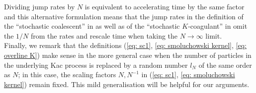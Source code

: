 \documentclass[11pt, notitlepage]{article}
\begin{document}
Dividing jump rates by $N$ is equivalent to accelerating time by the same factor and this alternative formulation means that the jump rates in the definition of the ``stochastic coalescent'' in  \cite{A99} as well as of the ``stochastic $K$-coagulant'' in \cite{N00} omit the $1/N$ from the rates and rescale time when taking the $N\rightarrow \infty$ limit. \medskip \\ Finally, we remark  that the definitions (\ref{eq: sc1}, \ref{eq: smoluchowski kernel}, \ref{eq: overline K}) make sense in the more general case when the number of particles in the underlying Kac process is replaced by a random number $l_N$ of the same order as $N$; in this case, the scaling factors $N, N^{-1}$ in (\ref{eq: sc1}, \ref{eq: smoluchowski kernel}) remain fixed. This mild generalisation will be helpful for our arguments.
\end{document}

